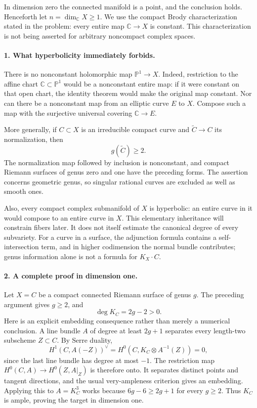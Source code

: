 \documentclass[11pt]{article}
\begin{document}
In dimension zero the connected manifold is a point, and the conclusion holds. Henceforth let $n=\dim_{\mathbb C}X\ge1$. We use the compact Brody characterization stated in the problem: every entire map $\mathbb C\to X$ is constant. This characterization is not being asserted for arbitrary noncompact complex spaces.

\paragraph{1. What hyperbolicity immediately forbids.}
There is no nonconstant holomorphic map $\mathbb P^1\to X$. Indeed, restriction to the affine chart $\mathbb C\subset\mathbb P^1$ would be a nonconstant entire map: if it were constant on that open chart, the identity theorem would make the original map constant. Nor can there be a nonconstant map from an elliptic curve $E$ to $X$. Compose such a map with the surjective universal covering $\mathbb C\to E$.

More generally, if $C\subset X$ is an irreducible compact curve and $\widetilde C\to C$ its normalization, then
\[
 g(\widetilde C)\ge2.                                  \tag{1}
\]
The normalization map followed by inclusion is nonconstant, and compact Riemann surfaces of genus zero and one have the preceding forms. The assertion concerns geometric genus, so singular rational curves are excluded as well as smooth ones.

Also, every compact complex submanifold of $X$ is hyperbolic: an entire curve in it would compose to an entire curve in $X$. This elementary inheritance will constrain fibers later. It does not itself estimate the canonical degree of every subvariety. For a curve in a surface, the adjunction formula contains a self-intersection term, and in higher codimension the normal bundle contributes; genus information alone is not a formula for $K_X\cdot C$.

\paragraph{2. A complete proof in dimension one.}
Let $X=C$ be a compact connected Riemann surface of genus $g$. The preceding argument gives $g\ge2$, and
\[
 \deg K_C=2g-2>0.
\]
Here is an explicit embedding consequence rather than merely a numerical conclusion. A line bundle $A$ of degree at least $2g+1$ separates every length-two subscheme $Z\subset C$. By Serre duality,
\[
 H^1(C,A(-Z))^{\vee}=H^0(C,K_C\otimes A^{-1}(Z))=0,
\]
since the last line bundle has degree at most $-1$. The restriction map $H^0(C,A)\to H^0(Z,A|_Z)$ is therefore onto. It separates distinct points and tangent directions, and the usual very-ampleness criterion gives an embedding. Applying this to $A=K_C^3$ works because $6g-6\ge2g+1$ for every $g\ge2$. Thus $K_C$ is ample, proving the target in dimension one.
\end{document}
